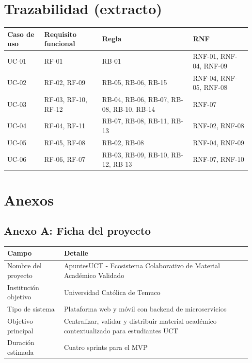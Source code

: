 \documentclass[12pt,a4paper]{article}
\begin{document}
\section{Trazabilidad (extracto)}

\begin{longtable}{p{} p{} p{} p{}}
\toprule
\textbf{Caso de uso} & \textbf{Requisito funcional} & \textbf{Regla} & \textbf{RNF}\\
\midrule
UC-01 & RF-01 & RB-01 & RNF-01, RNF-04, RNF-09\\
UC-02 & RF-02, RF-09 & RB-05, RB-06, RB-15 & RNF-04, RNF-05, RNF-08\\
UC-03 & RF-03, RF-10, RF-12 & RB-04, RB-06, RB-07, RB-08, RB-10, RB-14 & RNF-07\\
UC-04 & RF-04, RF-11 & RB-07, RB-08, RB-11, RB-13 & RNF-02, RNF-08\\
UC-05 & RF-05, RF-08 & RB-02, RB-08 & RNF-04, RNF-09\\
UC-06 & RF-06, RF-07 & RB-03, RB-09, RB-10, RB-12, RB-13 & RNF-07, RNF-10\\
\bottomrule
\end{longtable}

\section{Anexos}

\subsection*{Anexo A: Ficha del proyecto}

\begin{longtable}{p{} p{}}
\toprule
\textbf{Campo} & \textbf{Detalle}\\
\midrule
Nombre del proyecto & ApuntesUCT - Ecosistema Colaborativo de Material Académico Validado\\
Institución objetivo & Universidad Católica de Temuco\\
Tipo de sistema & Plataforma web y móvil con backend de microservicios\\
Objetivo principal & Centralizar, validar y distribuir material académico contextualizado para estudiantes UCT\\
Duración estimada & Cuatro sprints para el MVP\\
\bottomrule
\end{longtable}
\end{document}
